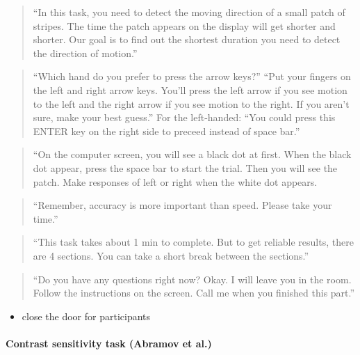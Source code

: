 \documentclass[]{article}
\providecommand{\tightlist}{%
  \setlength{\itemsep}{0pt}\setlength{\parskip}{0pt}}
\let\oldparagraph\paragraph
\renewcommand{\paragraph}[1]{\oldparagraph{#1}\mbox{}}
\begin{document}
\begin{quote}
``In this task, you need to detect the moving direction of a small patch
of stripes. The time the patch appears on the display will get shorter
and shorter. Our goal is to find out the shortest duration you need to
detect the direction of motion.''
\end{quote}

\begin{quote}
``Which hand do you prefer to press the arrow keys?'' ``Put your fingers
on the left and right arrow keys. You'll press the left arrow if you see
motion to the left and the right arrow if you see motion to the right.
If you aren't sure, make your best guess.'' For the left-handed: ``You
could press this ENTER key on the right side to preceed instead of space
bar.''
\end{quote}

\begin{quote}
``On the computer screen, you will see a black dot at first. When the
black dot appear, press the space bar to start the trial. Then you will
see the patch. Make responses of left or right when the white dot
appears.
\end{quote}

\begin{quote}
``Remember, accuracy is more important than speed. Please take your
time.''
\end{quote}

\begin{quote}
``This task takes about 1 min to complete. But to get reliable results,
there are 4 sections. You can take a short break between the sections.''
\end{quote}

\begin{quote}
``Do you have any questions right now? Okay. I will leave you in the
room. Follow the instructions on the screen. Call me when you finished
this part.''
\end{quote}

\begin{itemize}
\tightlist
\item
  close the door for participants
\end{itemize}

\paragraph{Contrast sensitivity task (Abramov et
al.)}\label{contrast-sensitivity-task-abramov-et-al.}
\end{document}
